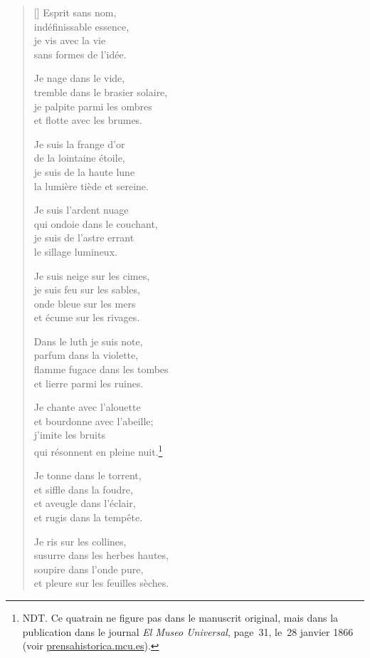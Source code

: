 \documentclass[a4paper,12pt]{book}
\begin{document}
\begin{verse}[\versewidth]
  Esprit sans nom, \\
  indéfinissable essence, \\
  je vis avec la vie \\
  sans formes de l'idée.

  Je nage dans le vide, \\
  tremble dans le brasier solaire, \\
  je palpite parmi les ombres \\
  et flotte avec les brumes.

  Je suis la frange d'or \\
  de la lointaine étoile, \\
  je suis de la haute lune \\
  la lumière tiède et sereine.

  Je suis l'ardent nuage \\
  qui ondoie dans le couchant, \\
  je suis de l'astre errant \\
  le sillage lumineux.

  Je suis neige sur les cimes, \\
  je suis feu sur les sables, \\
  onde bleue sur les mers \\
  et écume sur les rivages.

  Dans le luth je suis note, \\
  parfum dans la violette, \\
  flamme fugace dans les tombes \\
  et lierre parmi les ruines.

  Je chante avec l'alouette \\
  et bourdonne avec l'abeille; \\
  j'imite les bruits \\
  qui résonnent en pleine nuit.\footnote{NDT. Ce quatrain ne
figure pas dans le manuscrit original, mais dans la publication dans
le journal \emph{El Museo Universal}, page~31, le~28 janvier 1866 (voir \url{prensahistorica.mcu.es}).}

  Je tonne dans le torrent, \\
  et siffle dans la foudre, \\
  et aveugle dans l'éclair, \\
  et rugis dans la tempête.

  Je ris sur les collines, \\
  susurre dans les herbes hautes, \\
  soupire dans l'onde pure, \\
  et pleure sur les feuilles sèches.


\end{verse}
\end{document}
